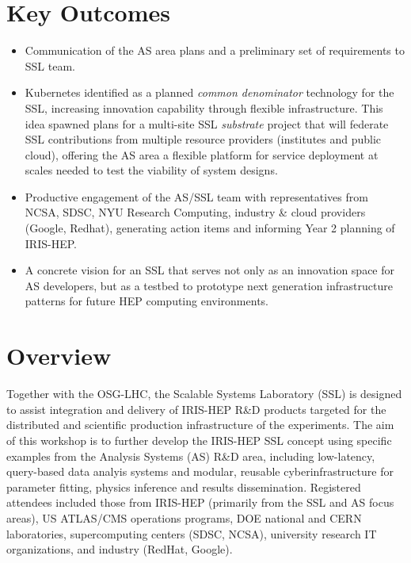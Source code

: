 \documentclass[11pt,letterpaper,fleqn]{article}
\begin{document}
\section*{Key Outcomes}
\vspace{3pt}
\begin{itemize}
  \item Communication of the AS area plans and a preliminary set of requirements to SSL team.
  \item Kubernetes identified as a planned {\it common denominator} technology for the SSL, increasing innovation capability through flexible infrastructure.  This idea spawned plans for a multi-site SSL {\it substrate} project that will federate SSL contributions from multiple resource providers (institutes and public cloud), offering the AS area a flexible platform for service deployment at scales needed to test the viability of system designs.
  \item Productive engagement of the AS/SSL team with representatives from NCSA, SDSC, NYU Research Computing, industry \& cloud providers (Google, Redhat), generating action items and informing Year 2 planning of IRIS-HEP.
  \item A concrete vision for an SSL that serves not only as an innovation space for AS developers, but as a testbed to prototype next generation infrastructure patterns for future HEP computing environments.
\end{itemize}


\newpage
\pagestyle{reststyle}

\section{Overview}
\vspace{0.2cm}
Together with the OSG-LHC, the Scalable Systems Laboratory (SSL) is designed to assist integration and delivery of IRIS-HEP R\&D products targeted for the distributed and scientific production infrastructure of the experiments. The aim of this workshop is to further develop the IRIS-HEP SSL concept using specific examples from the Analysis Systems (AS) R\&D area, including low-latency, query-based data analyis systems and modular, reusable cyberinfrastructure for parameter fitting, physics inference and results dissemination. Registered attendees included those from IRIS-HEP (primarily from the SSL and AS focus areas), US ATLAS/CMS operations programs, DOE national and CERN laboratories, supercomputing centers (SDSC, NCSA), university research IT organizations, and industry (RedHat, Google).
\end{document}
